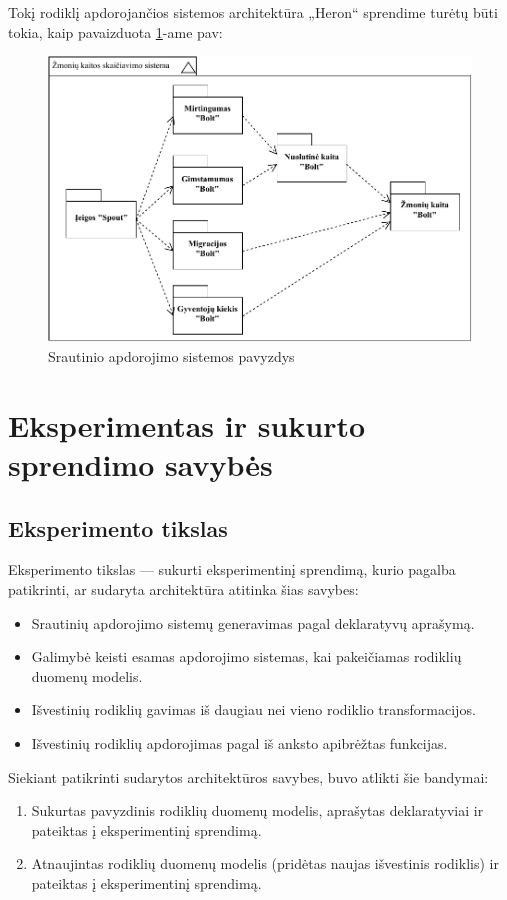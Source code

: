 \documentclass{VUMIFPSbakalaurinis}
\begin{document}
\pagebreak
Tokį rodiklį apdorojančios sistemos architektūra „Heron“ sprendime turėtų būti tokia, kaip pavaizduota \ref{img:example}-ame pav:
\begin{figure}[H]
    \centering
    \includegraphics[width=1\textwidth]{img/generuota_sistema.pdf}
    \caption{Srautinio apdorojimo sistemos pavyzdys}
    \label{img:example}
\end{figure}

\section{Eksperimentas ir sukurto sprendimo savybės}

\subsection{Eksperimento tikslas}

Eksperimento tikslas — sukurti eksperimentinį sprendimą, kurio pagalba patikrinti, ar sudaryta architektūra atitinka šias savybes:
\begin{itemize}
    \item Srautinių apdorojimo sistemų generavimas pagal deklaratyvų aprašymą.
    \item Galimybė keisti esamas apdorojimo sistemas, kai pakeičiamas rodiklių duomenų modelis.
    \item Išvestinių rodiklių gavimas iš daugiau nei vieno rodiklio transformacijos.
    \item Išvestinių rodiklių apdorojimas pagal iš anksto apibrėžtas funkcijas.
\end{itemize}  

\noindent Siekiant patikrinti sudarytos architektūros savybes, buvo atlikti šie bandymai:
\begin{enumerate}
    \item Sukurtas pavyzdinis rodiklių duomenų modelis, aprašytas deklaratyviai ir pateiktas į eksperimentinį sprendimą.
    \item Atnaujintas rodiklių duomenų modelis (pridėtas naujas išvestinis rodiklis) ir pateiktas į eksperimentinį sprendimą.
\end{enumerate}
\end{document}

